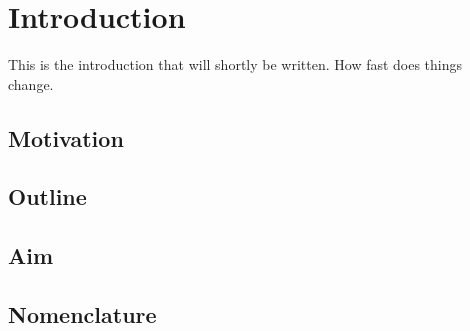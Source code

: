 %
%

\chapter{Introduction}\label{ch:introduction}

This is the introduction that will shortly be written. How fast does things change. 

\section{Motivation}\label{ch:introduction:motivation}
\section{Outline}\label{ch:introduction:outline}
\section{Aim}\label{ch:introduction:aim}
\section{Nomenclature}\label{ch:introduction:nomenclature}